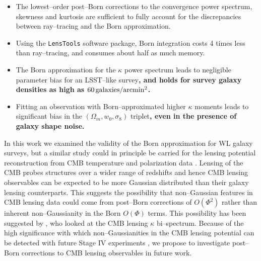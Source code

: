 \documentclass[reprint,aps,prd,superscriptaddress,showkeys,showpacs]{revtex4-1}
\newcommand{\ttt}[1]{\texttt{#1}}
\begin{document}
\begin{itemize}
\item The lowest--order post--Born corrections to the convergence power spectrum, skewness and kurtosis are sufficient to fully account for the discrepancies between ray--tracing and the Born approximation.
\item Using the \ttt{LensTools} software package, Born integration costs 4 times less than ray--tracing, and consumes about half as much memory.
\item The Born approximation for the $\kappa$ power spectrum leads to negligible parameter bias for an LSST--like survey\textbf{\color{blue}, and holds for survey galaxy densities as high as $60\,{\rm galaxies/arcmin^2}$.}
\item Fitting an observation with Born--approximated higher $\kappa$ moments leads to significant bias in the $(\Omega_m,w_0,\sigma_8)$ triplet\textbf{\color{blue}, even in the presence of galaxy shape noise.}    
\end{itemize}
%
In this work we examined the validity of the Born approximation for WL galaxy surveys, but a similar study could in principle be carried for the lensing potential reconstruction from CMB temperature and polarization data \citep{CMBCalabrese}. Lensing of the CMB probes structures over a wider range of redshifts and hence CMB lensing observables can be expected to be more Gaussian distributed than their galaxy lensing counterparts. This suggests the possibility that non--Gaussian features in CMB lensing data could come from post--Born corrections of $O(\Phi^2)$ rather than inherent non--Gaussianity in the Born $O(\Phi)$ terms. This possibility has been suggested by \citep{CMBPrattenLewis}, who looked at the CMB lensing $\kappa$ bi--spectrum. Because of the high significance with which non--Gaussianities in the CMB lensing potential can be detected with future Stage IV experiments \citep{CMBLNG}, we propose to investigate post--Born corrections to CMB lensing observables in future work.  

\end{document}

